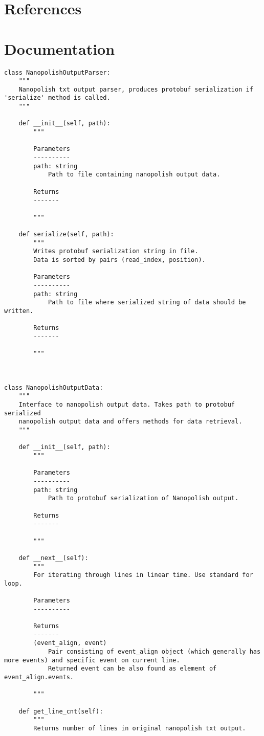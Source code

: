 \documentclass[]{article}
\begin{document}
\section{References}
\newpage

\section{Documentation}
\begin{lstlisting}
class NanopolishOutputParser:
	"""
	Nanopolish txt output parser, produces protobuf serialization if 'serialize' method is called.
	"""
	
	def __init__(self, path):
		"""
		
		Parameters
		----------
		path: string
			Path to file containing nanopolish output data.
		
		Returns
		-------
	
		"""
	
	def serialize(self, path):
		"""
		Writes protobuf serialization string in file.
		Data is sorted by pairs (read_index, position).
		
		Parameters
		----------
		path: string
			Path to file where serialized string of data should be written.
		
		Returns
		-------
		
		"""



class NanopolishOutputData:
	"""
	Interface to nanopolish output data. Takes path to protobuf serialized
	nanopolish output data and offers methods for data retrieval.
	"""
	
	def __init__(self, path):
		"""
		
		Parameters
		----------
		path: string
			Path to protobuf serialization of Nanopolish output.
		
		Returns
		-------
		
		"""
	
	def __next__(self):
		"""
		For iterating through lines in linear time. Use standard for loop. 
		
		Parameters
		----------
		
		Returns
		-------
		(event_align, event)
			Pair consisting of event_align object (which generally has more events) and specific event on current line.
			Returned event can be also found as element of event_align.events.
		
		"""
	
	def get_line_cnt(self):
		"""
		Returns number of lines in original nanopolish txt output.
		

\end{lstlisting}
\end{document}
